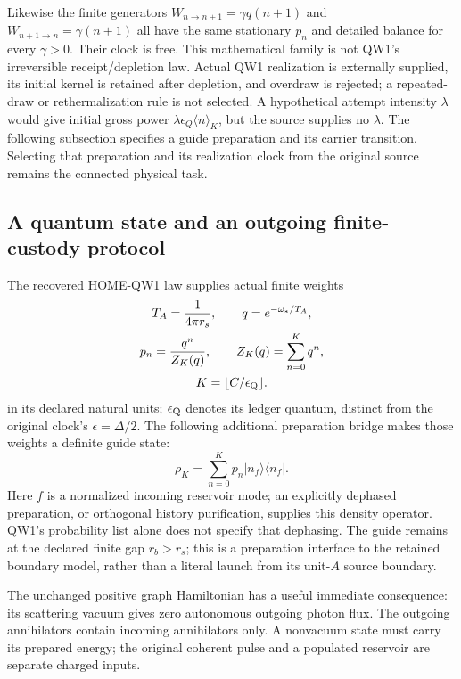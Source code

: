 \documentclass[10pt,twocolumn,letterpaper]{article}
\begin{document}
Likewise the finite generators
$W_{n\to n+1}=\gamma q(n+1)$ and
$W_{n+1\to n}=\gamma(n+1)$ all have the same stationary $p_n$ and
detailed balance for every $\gamma>0$. Their clock is free. This
mathematical family is not QW1's irreversible receipt/depletion law.
Actual QW1 realization is externally supplied, its initial kernel is
retained after depletion, and overdraw is rejected; a repeated-draw or
rethermalization rule is not selected. A hypothetical attempt intensity
$\lambda$ would give initial gross power
$\lambda\epsilon_Q\langle n\rangle_K$, but the source supplies no
$\lambda$. The following subsection specifies a guide preparation and its carrier transition. Selecting that preparation and its realization clock from the original source remains the connected physical task.


\subsection{A quantum state and an outgoing finite-custody protocol}
The recovered HOME-QW1 law supplies actual finite weights
\[
 \begin{gathered}
 T_A=\frac{1}{4\pi r_s},\qquad q=e^{-\omega_*/T_A},\\
 p_n=\frac{q^n}{Z_K(q)},\qquad Z_K(q)=\sum_{n=0}^Kq^n,\\
 K=\lfloor C/\epsilon_{\rm Q}\rfloor.
 \end{gathered}
\]
in its declared natural units; $\epsilon_{\rm Q}$ denotes its ledger quantum,
distinct from the original clock's $\epsilon=\Delta/2$. The following
additional preparation bridge
makes those weights a definite guide state:
\[
 \rho_K=\sum_{n=0}^Kp_n|n_f\rangle\langle n_f|.
\]
Here $f$ is a normalized incoming reservoir mode; an explicitly dephased
preparation, or orthogonal history purification, supplies this density
operator. QW1's probability list alone does not specify that dephasing.
The guide remains at the declared finite gap $r_b>r_s$; this is a
preparation interface to the retained boundary model, rather than a
literal launch from its unit-$A$ source boundary.

The unchanged positive graph Hamiltonian has a useful immediate consequence:
its scattering vacuum gives zero autonomous outgoing photon flux. The
outgoing annihilators contain incoming annihilators only. A nonvacuum state
must carry its prepared energy; the original coherent pulse and a populated
reservoir are separate charged inputs.
\end{document}
